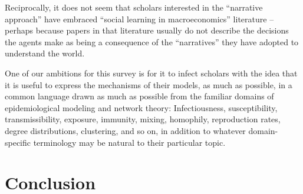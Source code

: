Reciprocally, it does not seem that scholars interested in the ``narrative approach'' have embraced ``social learning in macroeconomics'' literature -- perhaps because papers in that literature usually do not describe the decisions the agents make as being a consequence of the ``narratives'' they have adopted to understand the world.

One of our ambitions for this survey is for it to infect scholars with the idea that it is useful to express the mechanisms of their models, as much as possible, in a common language drawn as much as possible from the familiar domains of epidemiological modeling and network theory:  Infectiousness, susceptibility, transmissibility, exposure, immunity, mixing, homophily, reproduction rates, degree distributions, clustering, and so on, in addition to whatever domain-specific terminology may be natural to their particular topic.

\section{Conclusion}




% 



% 
% 

\pagebreak


